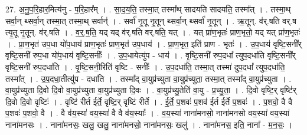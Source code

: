\documentclass[17pt]{extarticle}
\begin{document}
27. अ॒नु॒प॒रि॒हार॒मित्य॑नु - प॒रि॒हार᳚म् । . सा॒द॒य॒ति॒ तस्मा॒त् तस्मा᳚थ् सादयति सादयति॒ तस्मा᳚त् । . तस्मा॒थ् सर्वा॒न् थ्सर्वा॒न् तस्मा॒त् तस्मा॒थ् सर्वान्॑ । . सर्वा॑ नृ॒तू नृ॒तून् थ्सर्वा॒न् थ्सर्वा॑ नृ॒तून् । . ऋ॒तून्. व॑र्.षति वर्.ष त्यृ॒तू नृ॒तून्. व॑र्.षति । . व॒र्॒.ष॒ति॒ यद् यद् व॑र्.षति वर्.षति॒ यत् । . यत् प्रा॑ण॒भृतः॑ प्राण॒भृतो॒ यद् यत् प्रा॑ण॒भृतः॑ । . प्रा॒ण॒भृत॑ उप॒धा यो॑प॒धाय॑ प्राण॒भृतः॑ प्राण॒भृत॑ उप॒धाय॑ । . प्रा॒ण॒भृत॒ इति॑ प्राण - भृतः॑ । . उ॒प॒धाय॑ वृष्टि॒सनी᳚र् वृष्टि॒सनी॑ रुप॒धा यो॑प॒धाय॑ वृष्टि॒सनीः᳚ । . उ॒प॒धायेत्यु॑प - धाय॑ । . वृ॒ष्टि॒सनी॑ रुप॒दधा᳚ त्युप॒दधा॑ति वृष्टि॒सनी᳚र् वृष्टि॒सनी॑ रुप॒दधा॑ति । . वृ॒ष्टि॒सनी॒रिति॑ वृष्टि - सनीः᳚ । . उ॒प॒दधा॑ति॒ तस्मा॒त् तस्मा॑ दुप॒दधा᳚ त्युप॒दधा॑ति॒ तस्मा᳚त् । . उ॒प॒दधा॒तीत्यु॑प - दधा॑ति । . तस्मा᳚द् वा॒युप्र॑च्युता वा॒युप्र॑च्युता॒ तस्मा॒त् तस्मा᳚द् वा॒युप्र॑च्युता । . वा॒युप्र॑च्युता दि॒वो दि॒वो वा॒युप्र॑च्युता वा॒युप्र॑च्युता दि॒वः । . वा॒युप्र॑च्यु॒तेति॑ वा॒यु - प्र॒च्यु॒ता॒ । . दि॒वो वृष्टि॒र् वृष्टि॑र् दि॒वो दि॒वो वृष्टिः॑ । . वृष्टि॑ रीर्त ईर्ते॒ वृष्टि॒र् वृष्टि॑ रीर्ते । . ई॒र्ते॒ प॒शवः॑ प॒शव॑ ईर्त ईर्ते प॒शवः॑ । . प॒शवो॒ वै वै प॒शवः॑ प॒शवो॒ वै । . वै व॑य॒स्या॑ वय॒स्या॑ वै वै व॑य॒स्याः᳚ । . व॒य॒स्या॑ नाना॑मनसो॒ नाना॑मनसो वय॒स्या॑ वय॒स्या॑ नाना॑मनसः । . नाना॑मनसः॒ खलु॒ खलु॒ नाना॑मनसो॒ नाना॑मनसः॒ खलु॑ । . नाना॑मनस॒ इति॒ नाना᳚ - म॒न॒सः॒ । \newline
\end{document}
